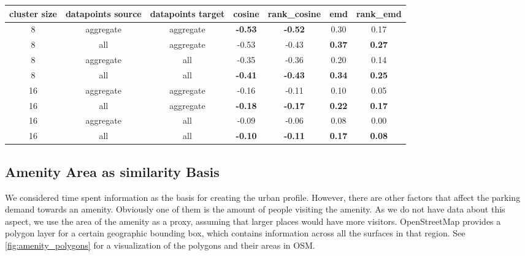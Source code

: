 	\begin{table}[!ht]
		{\begin{tabular}{ | c | c | c | c | c | c | c | }
				\hline
				{cluster size} & {datapoints source} & {datapoints target} & cosine & rank\_cosine & emd & rank\_emd \\ \hline
				8	&	aggregate 	&	aggregate 	& 	\textbf{-0.53}	&	\textbf{-0.52}	&	0.30	&	0.17 	\\ \hline
				8	&	all 		&	aggregate 	& 	-0.53	&	-0.43	&	\textbf{0.37}	&	\textbf{0.27}	\\ \hline \hline
				8	&	aggregate 	&	all 		& 	-0.35	&	-0.36	&	0.20	&	0.14	\\ \hline
				8	&	all			& 	all 		&	\textbf{-0.41}	&	\textbf{-0.43}	&	\textbf{0.34}	&	\textbf{0.25}	\\ \hline \hline
				16	&	aggregate	& 	aggregate 	&	-0.16	&	-0.11	&	0.10	&	0.05	\\ \hline
				16	&	all			& 	aggregate 	& 	\textbf{-0.18}	&	\textbf{-0.17}	&	\textbf{0.22}	&	\textbf{0.17}	\\ \hline \hline
				16	&	aggregate	& 	all 		& 	-0.09	&	-0.06	&	0.08	&	0.00	\\ \hline
				16	&	all			&	all 		&	\textbf{-0.10}	&	\textbf{-0.11}	&	\textbf{0.17}	&	\textbf{0.08}	\\ \hline \hline
		\end{tabular}}
		\label{tab:correlation_values}
	\end{table}
						
	\subsection{Amenity Area as similarity Basis}
	We considered time spent information as the basis for creating the urban profile. However, there are other factors that affect the parking demand towards an amenity.
	Obviously one of them is the amount of people visiting the amenity.
	As we do not have data about this aspect, we use the area of the amenity as a proxy, assuming that larger places would have more visitors.
	OpenStreetMap provides a polygon layer for a certain geographic bounding box, which contains information across all the surfaces in that region. See \cref{fig:amenity_polygons} for a visualization of the polygons and their areas in OSM. 
	
